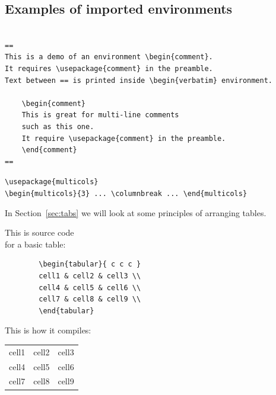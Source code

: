 \documentclass[a4paper,11pt]{article}
\begin{document}
\subsection{Examples of imported environments}


\begin{verbatim}

==
This is a demo of an environment \begin{comment}. 
It requires \usepackage{comment} in the preamble. 
Text between == is printed inside \begin{verbatim} environment.

	\begin{comment}
	This is great for multi-line comments 
	such as this one.
	It require \usepackage{comment} in the preamble.
	\end{comment}
==
\end{verbatim}

\verb|\usepackage{multicols}| \\
\verb|\begin{multicols}{3} ... \columnbreak ... \end{multicols}|

\begin{multicols}{3} %
	\clearpage\maketitle
	\thispagestyle{empty}
	 
	In Section~\ref{sec:tabs} we will look at some principles of arranging tables.

	\columnbreak 
	This is source code \\ for a basic table:
	\begin{verbatim}
		\begin{tabular}{ c c c } 
		cell1 & cell2 & cell3 \\ 
		cell4 & cell5 & cell6 \\ 
		cell7 & cell8 & cell9 \\ 
		\end{tabular}
	\end{verbatim}

	\columnbreak
	This is how it compiles:
	\begin{tabular}{ c c c } 
		cell1 & cell2 & cell3 \\
		cell4 & cell5 & cell6 \\ 
		cell7 & cell8 & cell9 \\ 
	\end{tabular}
	\setlength\fboxsep{3pt} %
	\setlength\fboxrule{1pt} %
\end{multicols}
\end{document}
